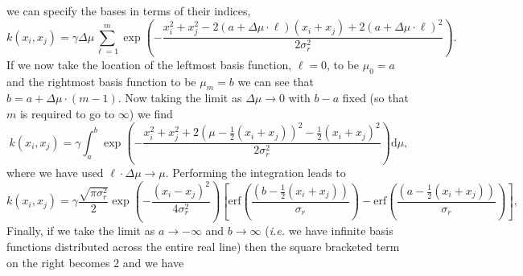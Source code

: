 we can specify the bases in terms of their indices,
\[
k\left(x_i,x_j\right) = \gamma\Delta\mu \sum_{\ell=1}^{m} \exp\left(
  -\frac{x^2_i + x^2_j - 2\left(a+\Delta\mu\cdot \ell\right)
    \left(x_i+x_j\right) + 2\left(a+\Delta\mu \cdot \ell\right)^2}{2
    \sigma_r^2} \right).
\]
If we now take the location of the leftmost basis function, $\ell=0$,
to be $\mu_0=a$ and the rightmost basis function to be $\mu_m=b$ we
can see that $b= a+ \Delta\mu\cdot(m-1)$. Now taking the limit as
$\Delta\mu\rightarrow 0$ with $b-a$ fixed (so that $m$ is required to
go to $\infty$) we find
\[
k\left(x_i,x_j\right) = \gamma \int_a^b \exp\left( -\frac{x^2_i +
    x^2_j + 2\left(\mu - \frac{1}{2}\left(x_i + x_j\right)\right)^2
    -\frac{1}{2}\left(x_i + x_j\right)^2}{2 \sigma_r^2}
\right)\mathrm{d}\mu,
\]
where we have used $\ell\cdot\Delta\mu\rightarrow \mu$.\detail{

\[
k\left(x_i,x_j\right) = \gamma \frac{\sqrt{\pi\sigma_r^2}}{2}
\exp\left( -\frac{x^2_i + x^2_j -\frac{1}{2}\left(x_i +
      x_j\right)^2}{2\sigma_r^2}\right)
\frac{2}{\sqrt{\pi\sigma_r^2}}\int_a^b \exp\left(-\frac{\left(\mu -
      \frac{1}{2}\left(x_i + x_j\right)\right)^2}{\sigma_r^2}
\right)\mathrm{d}\mu,
\]

\[
k\left(x_i,x_j\right) = \gamma \frac{\sqrt{\pi\sigma_r^2}}{2}
\exp\left( -\frac{x_i^2 -2x_ix_j + x_j^2}{4\sigma_r^2}\right)
\left[1+\mathrm{erf}\left(\frac{\left(\mu - \frac{1}{2}\left(x_i +
          x_j\right)\right)}{\sigma_r} \right)\right]_a^b,
\]
\[
k\left(x_i,x_j\right) = \gamma \frac{\sqrt{\pi\sigma_r^2}}{2}
\exp\left( -\frac{\left(x_i-x_j\right)^2}{4\sigma_r^2}\right)
\left[1+\mathrm{erf}\left(\frac{\left(\mu - \frac{1}{2}\left(x_i +
          x_j\right)\right)}{\sigma_r} \right)\right]_a^b,
\]}
Performing the integration leads to 
\[
k\left(x_i,x_j\right) = \gamma \frac{\sqrt{\pi\sigma_r^2}}{2}
\exp\left( -\frac{\left(x_i-x_j\right)^2}{4\sigma_r^2}\right)
\left[\mathrm{erf}\left(\frac{\left(b - \frac{1}{2}\left(x_i +
          x_j\right)\right)}{\sigma_r} \right) -
  \mathrm{erf}\left(\frac{\left(a - \frac{1}{2}\left(x_i +
          x_j\right)\right)}{\sigma_r} \right)\right],
\]
Finally, if we take the limit as $a\rightarrow -\infty$ and
$b\rightarrow \infty$ (\emph{i.e.} we have infinite basis functions
distributed across the entire real line) then the square bracketed
term on the right becomes 2 and we have

